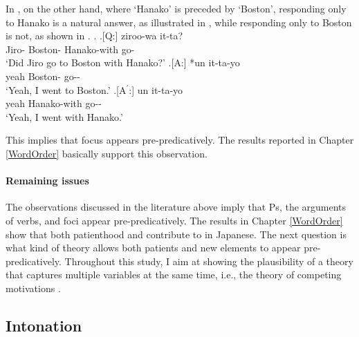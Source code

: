 In \Next,
on the other hand,
where `Hanako' is preceded by `Boston',
responding only to Hanako is a natural answer, as illustrated in \Next[A$^{\prime}$],
while responding only to Boston is not, as shown in \Next[A].
%
\ex.
 \a.[Q:] ziroo-wa   it-ta? \\
         Jiro- Boston- Hanako-with go- \\
         `Did Jiro go to Boston with Hanako?'
 \bg.[A:] *un  it-ta-yo \\
           yeah Boston- go-- \\
           `Yeah, I went to Boston.'
 \bg.[A$^{\prime}$:] un  it-ta-yo \\
           yeah Hanako-with go-- \\
           `Yeah, I went with Hanako.'
           \hfill{\cite[54]{kuno78}}

This implies that focus appears pre-predicatively.
The results reported in Chapter \ref{WordOrder} basically support this observation.

\paragraph{Remaining issues}

The observations discussed in the literature above imply that
Ps, the arguments of  verbs, and foci appear pre-predic\-a\-tively.
The results in Chapter \ref{WordOrder} show that both patienthood and  contribute to  in Japanese.
The next question is what kind of theory allows both patients and new elements to appear pre-predicatively.
Throughout this study,
I aim at showing the plausibility of a theory that captures multiple variables at the same time, i.e., the theory of competing motivations \cite{dubois85}.



\subsection{Intonation}\label{BackSubIntonation}

